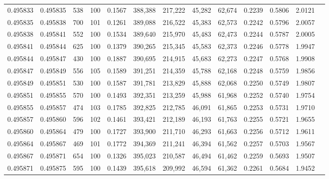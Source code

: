 \begin{tabular}{rrrrrrrrrrrrr}
0.495833 & 0.495835 &   538 & 100 &                                     0.1567 & 388,388 & 217,222 &  45,282 &  62,674 & 0.2239 & 0.5806 & 2.0121 \\
0.495835 & 0.495838 &   700 & 101 &                                     0.1261 & 389,088 & 216,522 &  45,383 &  62,573 & 0.2242 & 0.5796 & 2.0057 \\
0.495838 & 0.495841 &   552 & 100 &                                     0.1534 & 389,640 & 215,970 &  45,483 &  62,473 & 0.2244 & 0.5787 & 2.0005 \\
0.495841 & 0.495844 &   625 & 100 &                                     0.1379 & 390,265 & 215,345 &  45,583 &  62,373 & 0.2246 & 0.5778 & 1.9947 \\
0.495844 & 0.495847 &   430 & 100 &                                     0.1887 & 390,695 & 214,915 &  45,683 &  62,273 & 0.2247 & 0.5768 & 1.9908 \\
0.495847 & 0.495849 &   556 & 105 &                                     0.1589 & 391,251 & 214,359 &  45,788 &  62,168 & 0.2248 & 0.5759 & 1.9856 \\
0.495849 & 0.495851 &   530 & 100 &                                     0.1587 & 391,781 & 213,829 &  45,888 &  62,068 & 0.2250 & 0.5749 & 1.9807 \\
0.495851 & 0.495855 &   570 & 100 &                                     0.1493 & 392,351 & 213,259 &  45,988 &  61,968 & 0.2252 & 0.5740 & 1.9754 \\
0.495855 & 0.495857 &   474 & 103 &                                     0.1785 & 392,825 & 212,785 &  46,091 &  61,865 & 0.2253 & 0.5731 & 1.9710 \\
0.495857 & 0.495860 &   596 & 102 &                                     0.1461 & 393,421 & 212,189 &  46,193 &  61,763 & 0.2255 & 0.5721 & 1.9655 \\
0.495860 & 0.495864 &   479 & 100 &                                     0.1727 & 393,900 & 211,710 &  46,293 &  61,663 & 0.2256 & 0.5712 & 1.9611 \\
0.495864 & 0.495867 &   469 & 101 &                                     0.1772 & 394,369 & 211,241 &  46,394 &  61,562 & 0.2257 & 0.5703 & 1.9567 \\
0.495867 & 0.495871 &   654 & 100 &                                     0.1326 & 395,023 & 210,587 &  46,494 &  61,462 & 0.2259 & 0.5693 & 1.9507 \\
0.495871 & 0.495875 &   595 & 100 &                                     0.1439 & 395,618 & 209,992 &  46,594 &  61,362 & 0.2261 & 0.5684 & 1.9452 \\

\end{tabular}
